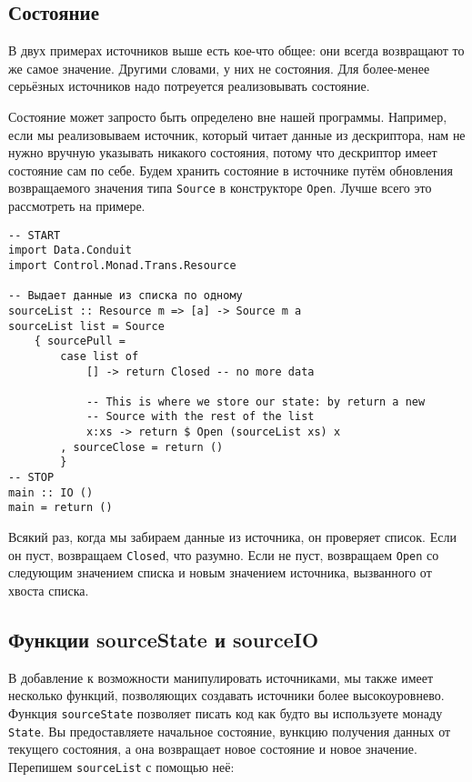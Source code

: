 \subsection{Состояние}

В двух примерах источников выше есть кое-что общее: они всегда возвращают то же самое
значение. Другими словами, у них не состояния. Для более-менее серьёзных источников надо
потреуется реализовывать состояние.

Состояние может запросто быть определено вне нашей программы. Например, если мы
реализовываем источник, который читает данные из дескриптора, нам не нужно вручную
указывать никакого состояния, потому что дескриптор имеет состояние сам по себе.
Будем хранить состояние в источнике путём обновления возвращаемого значения типа
\lstinline=Source= в конструкторе \lstinline=Open=. Лучше всего это рассмотреть на
примере.

\begin{lstlisting}
-- START
import Data.Conduit
import Control.Monad.Trans.Resource

-- Выдает данные из списка по одному
sourceList :: Resource m => [a] -> Source m a
sourceList list = Source
    { sourcePull =
        case list of
            [] -> return Closed -- no more data

            -- This is where we store our state: by return a new
            -- Source with the rest of the list
            x:xs -> return $ Open (sourceList xs) x
        , sourceClose = return ()
        }
-- STOP
main :: IO ()
main = return ()
\end{lstlisting}

Всякий раз, когда мы забираем данные из источника, он проверяет список. Если он пуст,
возвращаем \lstinline=Closed=, что разумно. Если не пуст, возвращаем \lstinline=Open= со
следующим значением
списка и новым значением источника, вызванного от хвоста списка.

\subsection{Функции sourceState и sourceIO}

В добавление к возможности манипулировать источниками, мы также имеет несколько функций,
позволяющих создавать источники более высокоуровнево. Функция \lstinline=sourceState=
позволяет писать
код как будто вы используете монаду \lstinline=State=. Вы предоставляете начальное
состояние,
вункцию получения данных от текущего состояния, а она возвращает новое состояние и
новое значение. Перепишем \lstinline=sourceList= с помощью неё:

